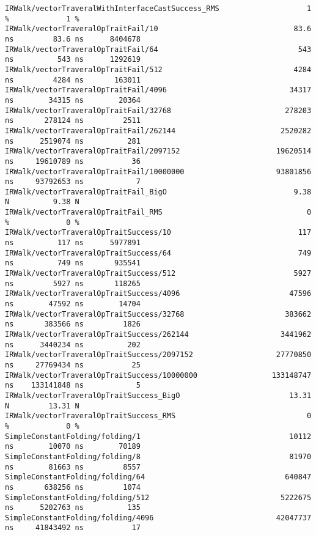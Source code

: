 \begin{code}
\begin{verbatim}
IRWalk/vectorTraveralWithInterfaceCastSuccess_RMS                    1 %             1 %
IRWalk/vectorTraveralOpTraitFail/10                               83.6 ns         83.6 ns      8404678
IRWalk/vectorTraveralOpTraitFail/64                                543 ns          543 ns      1292619
IRWalk/vectorTraveralOpTraitFail/512                              4284 ns         4284 ns       163011
IRWalk/vectorTraveralOpTraitFail/4096                            34317 ns        34315 ns        20364
IRWalk/vectorTraveralOpTraitFail/32768                          278203 ns       278124 ns         2511
IRWalk/vectorTraveralOpTraitFail/262144                        2520282 ns      2519074 ns          281
IRWalk/vectorTraveralOpTraitFail/2097152                      19620514 ns     19610789 ns           36
IRWalk/vectorTraveralOpTraitFail/10000000                     93801856 ns     93792653 ns            7
IRWalk/vectorTraveralOpTraitFail_BigO                             9.38 N          9.38 N
IRWalk/vectorTraveralOpTraitFail_RMS                                 0 %             0 %
IRWalk/vectorTraveralOpTraitSuccess/10                             117 ns          117 ns      5977891
IRWalk/vectorTraveralOpTraitSuccess/64                             749 ns          749 ns       935541
IRWalk/vectorTraveralOpTraitSuccess/512                           5927 ns         5927 ns       118265
IRWalk/vectorTraveralOpTraitSuccess/4096                         47596 ns        47592 ns        14704
IRWalk/vectorTraveralOpTraitSuccess/32768                       383662 ns       383566 ns         1826
IRWalk/vectorTraveralOpTraitSuccess/262144                     3441962 ns      3440234 ns          202
IRWalk/vectorTraveralOpTraitSuccess/2097152                   27770850 ns     27769434 ns           25
IRWalk/vectorTraveralOpTraitSuccess/10000000                 133148747 ns    133141848 ns            5
IRWalk/vectorTraveralOpTraitSuccess_BigO                         13.31 N         13.31 N
IRWalk/vectorTraveralOpTraitSuccess_RMS                              0 %             0 %
SimpleConstantFolding/folding/1                                  10112 ns        10070 ns        70189
SimpleConstantFolding/folding/8                                  81970 ns        81663 ns         8557
SimpleConstantFolding/folding/64                                640847 ns       638256 ns         1074
SimpleConstantFolding/folding/512                              5222675 ns      5202763 ns          135
SimpleConstantFolding/folding/4096                            42047737 ns     41843492 ns           17

\end{verbatim}
\end{code}
